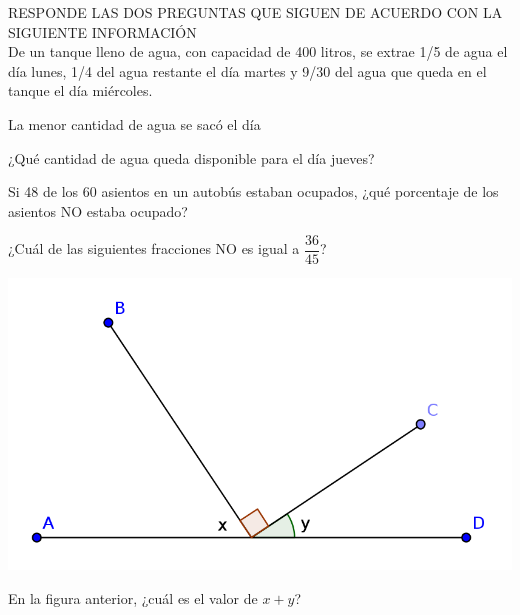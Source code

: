 \documentclass[letterpaper,10pt]{examdesign}
\begin{document}
\begin{multiplechoice}[rearrange=no,keycolumns=4,examcolumns=2]
\begin{block}
\begin{question}
\end{question}
\end{block}
\begin{block}
RESPONDE LAS DOS PREGUNTAS QUE SIGUEN DE ACUERDO CON LA SIGUIENTE INFORMACIÓN\\
De un tanque lleno de agua, con capacidad de 400 litros, se extrae 1/5  de agua el día lunes, 1/4 del agua restante el día martes y 9/30 del agua que queda en el tanque el día miércoles.
\begin{question}
La menor cantidad de agua se sacó el día
\end{question}
\begin{question}
¿Qué cantidad de agua queda disponible para el día jueves?
\end{question}
\end{block}
\begin{question}
Si 48 de los 60 asientos en un autobús estaban ocupados, ¿qué porcentaje de los asientos NO estaba ocupado?
\end{question}
\begin{question}
¿Cuál de las siguientes fracciones NO es igual a $\dfrac{36}{45}$?
\end{question}
\begin{block}
\includegraphics{Images/angulosxy.png} 
\begin{question}
En la figura anterior, ¿cuál es el valor de $x+y$?

\end{question}
\end{block}
\end{multiplechoice}
\end{document}
